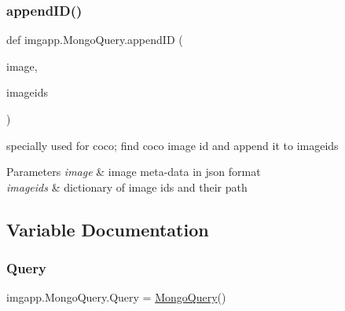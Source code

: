 \subsubsection{\texorpdfstring{append\+I\+D()}{appendID()}}
{\footnotesize\ttfamily def imgapp.\+Mongo\+Query.\+append\+ID (\begin{DoxyParamCaption}\item[{}]{image,  }\item[{}]{imageids }\end{DoxyParamCaption})}



specially used for coco; find coco image id and append it to imageids 


\begin{DoxyParams}{Parameters}
{\em image} & image meta-\/data in json format \\
\hline
{\em imageids} & dictionary of image ids and their path \\
\hline
\end{DoxyParams}


\subsection{Variable Documentation}
\mbox{\label{namespaceimgapp_1_1MongoQuery_a3c845d9e355454c43db2eca20b9058bb}} 
\subsubsection{\texorpdfstring{Query}{Query}}
{\footnotesize\ttfamily imgapp.\+Mongo\+Query.\+Query = \hyperlink{classimgapp_1_1MongoQuery_1_1MongoQuery}{Mongo\+Query}()}

